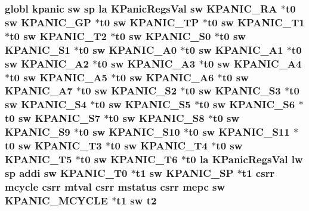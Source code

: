 \hypertarget{riscv_2kpanica_8S_acc887edd9beea7a8114192d29e7ba09b}{
\subsubsection[{t2}]{\setlength{\rightskip}{0pt plus 5cm}globl {\bf kpanic} {\bf sw} {\bf sp} {\bf la} {\bf K\-Panic\-Regs\-Val} {\bf sw} {\bf K\-P\-A\-N\-I\-C\-\_\-\-R\-A} $\ast${\bf t0} {\bf sw} {\bf K\-P\-A\-N\-I\-C\-\_\-\-G\-P} $\ast${\bf t0} {\bf sw} {\bf K\-P\-A\-N\-I\-C\-\_\-\-T\-P} $\ast${\bf t0} {\bf sw} {\bf K\-P\-A\-N\-I\-C\-\_\-\-T1} $\ast${\bf t0} {\bf sw} {\bf K\-P\-A\-N\-I\-C\-\_\-\-T2} $\ast${\bf t0} {\bf sw} {\bf K\-P\-A\-N\-I\-C\-\_\-\-S0} $\ast${\bf t0} {\bf sw} {\bf K\-P\-A\-N\-I\-C\-\_\-\-S1} $\ast${\bf t0} {\bf sw} {\bf K\-P\-A\-N\-I\-C\-\_\-\-A0} $\ast${\bf t0} {\bf sw} {\bf K\-P\-A\-N\-I\-C\-\_\-\-A1} $\ast${\bf t0} {\bf sw} {\bf K\-P\-A\-N\-I\-C\-\_\-\-A2} $\ast${\bf t0} {\bf sw} {\bf K\-P\-A\-N\-I\-C\-\_\-\-A3} $\ast${\bf t0} {\bf sw} {\bf K\-P\-A\-N\-I\-C\-\_\-\-A4} $\ast${\bf t0} {\bf sw} {\bf K\-P\-A\-N\-I\-C\-\_\-\-A5} $\ast${\bf t0} {\bf sw} {\bf K\-P\-A\-N\-I\-C\-\_\-\-A6} $\ast${\bf t0} {\bf sw} {\bf K\-P\-A\-N\-I\-C\-\_\-\-A7} $\ast${\bf t0} {\bf sw} {\bf K\-P\-A\-N\-I\-C\-\_\-\-S2} $\ast${\bf t0} {\bf sw} {\bf K\-P\-A\-N\-I\-C\-\_\-\-S3} $\ast${\bf t0} {\bf sw} {\bf K\-P\-A\-N\-I\-C\-\_\-\-S4} $\ast${\bf t0} {\bf sw} {\bf K\-P\-A\-N\-I\-C\-\_\-\-S5} $\ast${\bf t0} {\bf sw} {\bf K\-P\-A\-N\-I\-C\-\_\-\-S6} $\ast${\bf t0} {\bf sw} {\bf K\-P\-A\-N\-I\-C\-\_\-\-S7} $\ast${\bf t0} {\bf sw} {\bf K\-P\-A\-N\-I\-C\-\_\-\-S8} $\ast${\bf t0} {\bf sw} {\bf K\-P\-A\-N\-I\-C\-\_\-\-S9} $\ast${\bf t0} {\bf sw} {\bf K\-P\-A\-N\-I\-C\-\_\-\-S10} $\ast${\bf t0} {\bf sw} {\bf K\-P\-A\-N\-I\-C\-\_\-\-S11} $\ast${\bf t0} {\bf sw} {\bf K\-P\-A\-N\-I\-C\-\_\-\-T3} $\ast${\bf t0} {\bf sw} {\bf K\-P\-A\-N\-I\-C\-\_\-\-T4} $\ast${\bf t0} {\bf sw} {\bf K\-P\-A\-N\-I\-C\-\_\-\-T5} $\ast${\bf t0} {\bf sw} {\bf K\-P\-A\-N\-I\-C\-\_\-\-T6} $\ast${\bf t0} {\bf la} {\bf K\-Panic\-Regs\-Val} {\bf lw} {\bf sp} addi {\bf sw} {\bf K\-P\-A\-N\-I\-C\-\_\-\-T0} $\ast${\bf t1} {\bf sw} {\bf K\-P\-A\-N\-I\-C\-\_\-\-S\-P} $\ast${\bf t1} csrr mcycle csrr mtval csrr {\bf mstatus} csrr {\bf mepc} {\bf sw} {\bf K\-P\-A\-N\-I\-C\-\_\-\-M\-C\-Y\-C\-L\-E} $\ast${\bf t1} {\bf sw} t2}}\label{riscv_2kpanica_8S_acc887edd9beea7a8114192d29e7ba09b}
